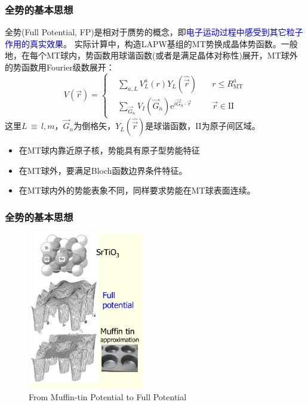 \documentclass[cjk,slidestop,compress,mathserif,blue]{beamer}
\newcommand{\upcite}[1]{\hspace{0ex}\textsuperscript{\cite{#1}}} %
\begin{document}
\frame
{
\frametitle{全势的基本思想}
全势\textrm{(Full Potential, FP)}是相对于赝势的概念，即\textcolor{blue}{电子运动过程中感受到其它粒子作用的真实效果}。
实际计算中，构造\textrm{LAPW}基组的\textrm{MT}势换成晶体势函数。一般地，在每个\textrm{MT}球内，势函数用球谐函数(或者是满足晶体对称性)展开，\textrm{MT}球外的势函数用\textrm{Fourier}级数展开：%
{\footnotesize$$ V(\vec r)=\left\{
  \begin{aligned}
    &\sum_{a,L}V_L^a(r)Y_L(\hat{\vec r})\quad &r\leqslant R_{\mathrm{MT}}^a\\
    &\sum_{\vec G_n}V_I(\vec G_n)\textrm{e}^{i\vec G_n\cdot\vec r} &\vec r\in\mathrm{II}
  \end{aligned}\right.
  \label{eq:solid-63}
$$}
这里$L$\,$\equiv$\,$l,m$，$\vec G_n$为倒格矢，$Y_L(\hat{\vec r})$是球谐函数，\textrm{II}为原子间区域。
\begin{itemize}
	\item 在\textrm{MT}球内靠近原子核，势能具有原子型势能特征
	\item 在\textrm{MT}球外，要满足\textrm{Bloch}函数边界条件特征。
	\item 在\textrm{MT}球内外的势能表象不同，同样要求势能在\textrm{MT}球表面连续。
\end{itemize}
}

\frame
{
\frametitle{全势的基本思想}
\vspace*{-13pt}
\begin{figure}[h!]
\centering
\includegraphics[height=2.70in,width=2.02in,viewport=1 22 507 715,clip]{Figures/MT_FP.png}
\caption{\small \textrm{From Muffin-tin Potential to Full Potential}}%
\label{Muffin_tin_LO}
\end{figure}
}
\end{document}
